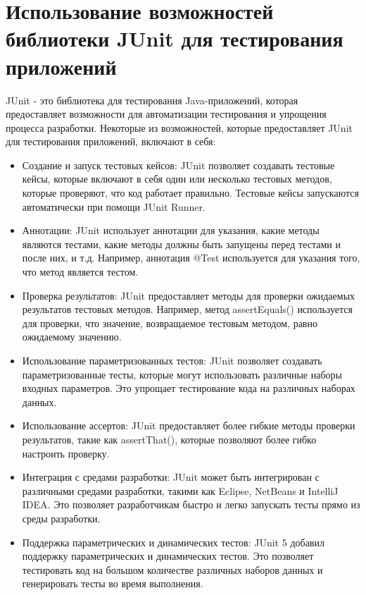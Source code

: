 \section{Использование возможностей библиотеки JUnit для тестирования приложений}
JUnit - это библиотека для тестирования Java-приложений, которая предоставляет возможности для автоматизации тестирования и упрощения процесса разработки. Некоторые из возможностей, которые предоставляет JUnit для тестирования приложений, включают в себя:
    \begin{itemize}
    \item Создание и запуск тестовых кейсов: JUnit позволяет создавать тестовые кейсы, которые включают в себя один или несколько тестовых методов, которые проверяют, что код работает правильно. Тестовые кейсы запускаются автоматически при помощи JUnit Runner.

    \item Аннотации: JUnit использует аннотации для указания, какие методы являются тестами, какие методы должны быть запущены перед тестами и после них, и т.д. Например, аннотация @Test используется для указания того, что метод является тестом.

    \item Проверка результатов: JUnit предоставляет методы для проверки ожидаемых результатов тестовых методов. Например, метод \newline assertEquals() используется для проверки, что значение, возвращаемое тестовым методом, равно ожидаемому значению.

    \item Использование параметризованных тестов: JUnit позволяет создавать параметризованные тесты, которые могут использовать различные наборы входных параметров. Это упрощает тестирование кода на различных наборах данных.

    \item Использование ассертов: JUnit предоставляет более гибкие методы проверки результатов, такие как assertThat(), которые позволяют более гибко настроить проверку.

    \item Интеграция с средами разработки: JUnit может быть интегрирован с различными средами разработки, такими как Eclipse, NetBeans и IntelliJ IDEA. Это позволяет разработчикам быстро и легко запускать тесты прямо из среды разработки.

    \item Поддержка параметрических и динамических тестов: JUnit 5 добавил поддержку параметрических и динамических тестов. Это позволяет тестировать код на большом количестве различных наборов данных и генерировать тесты во время выполнения.
    \end{itemize}

